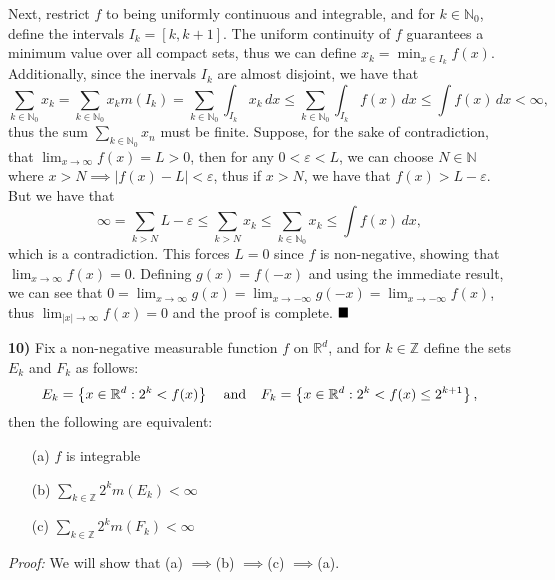 \documentclass[12pt]{article}
\newcommand{\N}{\ensuremath{\mathbb{N}}}
\newcommand{\Z}{\ensuremath{\mathbb{Z}}}
\newcommand{\R}{\ensuremath{\mathbb{R}}}
\newcommand{\e}{\ensuremath{\varepsilon}}
\newcommand{\braceb}[1]{\left\{#1\right\}}
\newcommand{\vertb}[1]{\left\vert#1\right\vert}
\newcommand{\proof}{\textit{Proof: }}
\newcommand{\done}{\ensuremath{\strut\hfill\blacksquare}}
\renewcommand{\t}[1]{\text{ #1 }}
\newcommand{\impl}{\ensuremath{\implies}}
\newcommand{\sectionskip}{\vspace{0.15in}}
\begin{document}
Next, restrict \( f \) to being uniformly continuous and integrable, and for
\( k \in \N_0 \), define the intervals \( I_k = [k, k + 1] \).
The uniform continuity of \( f \) guarantees a minimum value over all compact
sets, thus we can define \( x_k = \min_{x \in I_k} f(x) \).
Additionally, since the inervals \( I_k \) are almost disjoint, we have that
\[
	\sum_{k \in \N_0} x_k
	= \sum_{k \in \N_0} x_km(I_k)
	= \sum_{k \in \N_0} \int_{I_k} x_k \, dx
	\leq \sum_{k \in \N_0} \int_{I_k} f(x) \, dx
	\leq \int f(x) \, dx
	< \infty,
\]
thus the sum \( \sum_{k \in \N_0} x_n \) must be finite.
Suppose, for the sake of contradiction, that
\( \lim_{x \to \infty} f(x) = L > 0 \), then for any \( 0 < \e < L \), we can
choose \( N \in \N \) where \( x > N \implies \vertb{f(x) - L} < \e \), thus if
\( x > N \), we have that \( f(x) > L - \e \). But we have that
\[
	\infty
	= \sum_{k > N} L - \e
	\leq \sum_{k > N} x_k
	\leq \sum_{k \in \N_0} x_k
	\leq \int f(x) \, dx,
\]
which is a contradiction.
This forces \( L = 0 \) since \( f \) is non-negative, showing that
\( \lim_{x \to \infty} f(x) = 0 \).
Defining \( g(x) = f(-x) \) and using the immediate result, we can see that
\(
0
= \lim_{x \to \infty} g(x)
= \lim_{x \to -\infty} g(-x)
= \lim_{x \to -\infty} f(x)
\),
thus \( \lim_{\vertb{x} \to \infty} f(x) = 0 \) and the proof is complete.
\done

\sectionskip

\textbf{10)}
Fix a non-negative measurable function \( f \) on \( \R^d \), and for
\( k \in \Z \) define the sets \( E_k \) and \( F_k \) as follows:
\[
	E_k = \braceb{x \in \R^d : 2^k < f(x)}
	\hspace{0.1in}
	\t{and}
	\hspace{0.1in}
	F_k = \braceb{x \in \R^d : 2^k < f(x) \leq 2^{k + 1}},
\]
then the following are equivalent:
\begin{itemize}
	\item[(a)] \( f \) is integrable

	\item[(b)] \( \displaystyle \sum_{k \in \Z} 2^k m(E_k) < \infty \)

	\item[(c)] \( \displaystyle \sum_{k \in \Z} 2^k m(F_k) < \infty \)
\end{itemize}

\proof
We will show that (a) \impl (b) \impl (c) \impl (a).
\end{document}
